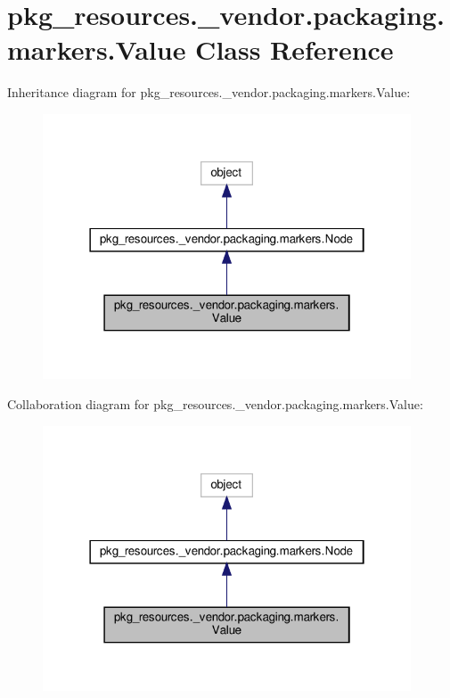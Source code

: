 \hypertarget{classpkg__resources_1_1__vendor_1_1packaging_1_1markers_1_1Value}{}\section{pkg\+\_\+resources.\+\_\+vendor.\+packaging.\+markers.\+Value Class Reference}
\label{classpkg__resources_1_1__vendor_1_1packaging_1_1markers_1_1Value}


Inheritance diagram for pkg\+\_\+resources.\+\_\+vendor.\+packaging.\+markers.\+Value\+:
\nopagebreak
\begin{figure}[H]
\begin{center}
\leavevmode
\includegraphics[width=310pt]{classpkg__resources_1_1__vendor_1_1packaging_1_1markers_1_1Value__inherit__graph}
\end{center}
\end{figure}


Collaboration diagram for pkg\+\_\+resources.\+\_\+vendor.\+packaging.\+markers.\+Value\+:
\nopagebreak
\begin{figure}[H]
\begin{center}
\leavevmode
\includegraphics[width=310pt]{classpkg__resources_1_1__vendor_1_1packaging_1_1markers_1_1Value__coll__graph}
\end{center}
\end{figure}
